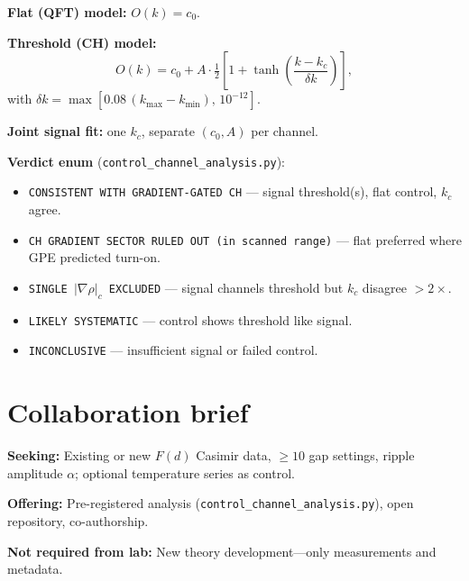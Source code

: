 \documentclass[11pt,a4paper]{article}
\begin{document}
\textbf{Flat (QFT) model:} $O(k) = c_0$.

\textbf{Threshold (CH) model:}
\begin{equation}
  O(k) = c_0 + A \cdot \tfrac{1}{2}\left[1 + \tanh\!\left(\frac{k - k_c}{\delta k}\right)\right],
\end{equation}
with $\delta k = \max[0.08\,(k_{\max}-k_{\min}),\,10^{-12}]$.

\textbf{Joint signal fit:} one $k_c$, separate $(c_0, A)$ per channel.

\textbf{Verdict enum} (\texttt{control\_channel\_analysis.py}):
\begin{itemize}[leftmargin=*]
  \item \texttt{CONSISTENT WITH GRADIENT-GATED CH} --- signal threshold(s), flat control, $k_c$ agree.
  \item \texttt{CH GRADIENT SECTOR RULED OUT (in scanned range)} --- flat preferred where GPE predicted turn-on.
  \item \texttt{SINGLE $|\nabla\rho|_c$ EXCLUDED} --- signal channels threshold but $k_c$ disagree $>2\times$.
  \item \texttt{LIKELY SYSTEMATIC} --- control shows threshold like signal.
  \item \texttt{INCONCLUSIVE} --- insufficient signal or failed control.
\end{itemize}

\section{Collaboration brief}
\label{app:collab}

\textbf{Seeking:} Existing or new $F(d)$ Casimir data, $\geq 10$ gap settings, ripple amplitude $\alpha$; optional temperature series as control.

\textbf{Offering:} Pre-registered analysis (\texttt{control\_channel\_analysis.py}), open repository, co-authorship.

\textbf{Not required from lab:} New theory development---only measurements and metadata.
\end{document}
